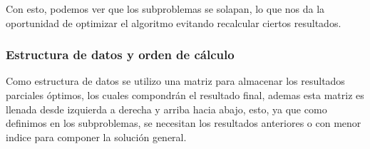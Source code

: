 Con esto, podemos ver que los subproblemas se solapan, lo que nos da la oportunidad
de optimizar el algoritmo evitando recalcular ciertos resultados.

\subsubsection{Estructura de datos y orden de cálculo}

Como estructura de datos se utilizo una matriz para almacenar los resultados
parciales óptimos, los cuales compondrán el resultado final, ademas esta matriz 
es llenada desde izquierda a derecha y arriba hacia abajo, esto, ya que como definimos
en los subproblemas, se necesitan los resultados anteriores o con menor indice para componer
la solución general.